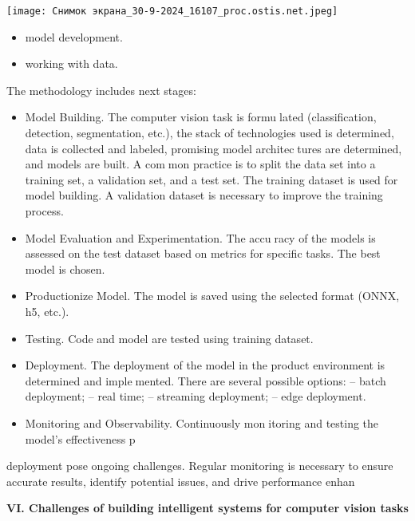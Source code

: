 \documentclass{article}
\begin{document}
\newpage
\begin{multicols}{2}


    \texttt{[image: Снимок экрана\_30-9-2024\_16107\_proc.ostis.net.jpeg]}
\begin{itemize}[noitemsep]
    \item  model development.
\item working with data.
\end{itemize}
The methodology includes next stages:
\begin{itemize}[noitemsep]
\item Model Building. The computer vision task is formulated (classification, detection, segmentation, etc.),
the stack of technologies used is determined, data
is collected and labeled, promising model architectures are determined, and models are built. A common practice is to split the data set into a training
set, a validation set, and a test set. The training
dataset is used for model building. A validation
dataset is necessary to improve the training process.
\item Model Evaluation and Experimentation. The accuracy of the models is assessed on the test dataset
based on metrics for specific tasks. The best model
is chosen.
\item Productionize Model. The model is saved using the
selected format (ONNX, h5, etc.).
\item Testing. Code and model are tested using training
dataset.
\item Deployment. The deployment of the model in
the product environment is determined and implemented. There are several possible options:
– batch deployment;
– real time;
– streaming deployment;
– edge deployment.
\item Monitoring and Observability. Continuously monitoring and testing the model’s effectiveness p

  \end{itemize}







 deployment pose ongoing challenges. Regular monitoring is necessary to ensure accurate results, identify potential issues, and drive performance enhan
   
   
 
\textbf{VI. Challenges of building intelligent systems for
computer vision tasks}


\end{multicols}
\end{document}
